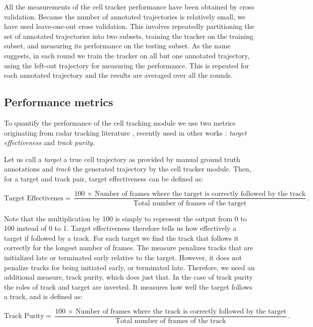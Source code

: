 	All the measurements of the cell tracker performance have been obtained by cross validation. Because the number of annotated trajectories is relatively small, we have used leave-one-out cross validation. This involves repeatedly partitioning the set of annotated trajectories into two subsets, training the tracker on the training subset, and measuring its performance on the testing subset. As the name suggests, in each round we train the tracker on all but one annotated trajectory, using the left-out trajectory for measuring the performance. This is repeated for each annotated trajectory and the results are averaged over all the rounds.

	\subsection{Performance metrics \statusfirstdraft}
	
	To quantify the performance of the cell tracking module we use two metrics originating from radar tracking literature \cite{blackman99}, recently used in other works \cite{bise11global, huh13, eom07}: \textit{target effectiveness} and \textit{track purity}.
	
	Let us call a \textit{target} a true cell trajectory as provided by manual ground truth annotations and \textit{track} the generated trajectory by the cell tracker module. Then, for a target and track pair, target effectiveness can be defined as:
	
	\[
		\text{Target Effectivenes} = \frac{\text{100 $\times$ Number of frames where the target is correctly followed by the track}}{\text{Total number of frames of the target}}\text{.}
	\]
	
	Note that the multiplication by 100 is simply to represent the output from 0 to 100 instead of 0 to 1. 	Target effectiveness therefore tells us how effectively a target if followed by a track. For each target we find the track that follows it correctly for the longest number of frames. The measure penalizes tracks that are initialized late or terminated early relative to the target. However, it does not penalize tracks for being initiated early, or terminated late. Therefore, we need an additional measure, track purity, which does just that. In the case of track purity the roles of track and target are inverted. It measures how well the target follows a track, and is defined as:
	
	\[
		\text{Track Purity} = \frac{\text{100 $\times$ Number of frames where the track is correctly followed by the target}}{\text{Total number of frames of the track}}\text{.}
	\]
	
